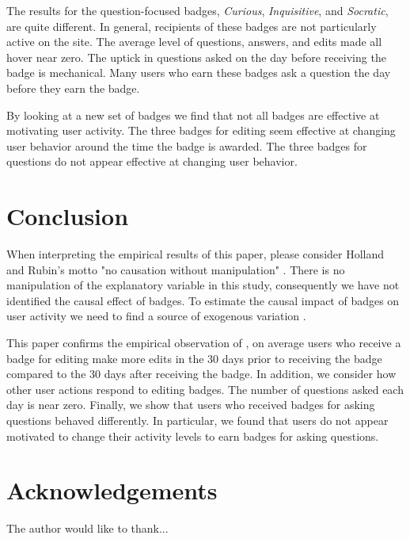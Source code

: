 \documentclass[conference]{IEEEtran}
\newcommand{\1}{\mathds{1}}
\begin{document}
The results for the question-focused badges, \textit{Curious}, \textit{Inquisitive}, and \textit{Socratic}, are quite different. In general, recipients of these badges are not particularly active on the site. The average level of questions, answers, and edits made all hover near zero. The uptick in questions asked on the day before receiving the badge is mechanical. Many users who earn these badges ask a question the day before they earn the badge.

By looking at a new set of badges we find that not all badges are effective at motivating user activity. The three badges for editing seem effective at changing user behavior around the time the badge is awarded. The three badges for questions do not appear effective at changing user behavior.

\section{Conclusion}

When interpreting the empirical results of this paper, please consider Holland and Rubin's motto "no causation without manipulation" \citep{Holland1986}. There is no manipulation of the explanatory variable in this study, consequently we have not identified the causal effect of badges. To estimate the causal impact of badges on user activity we need to find a source of exogenous variation \citep{Miller2013}.

This paper confirms the empirical observation of \citet{Grant2013}, on average users who receive a badge for editing make more edits in the 30 days prior to receiving the badge compared to the 30 days after receiving the badge. In addition, we consider how other user actions respond to editing badges. The number of questions asked each day is near zero. Finally, we show that users who received badges for asking questions behaved differently. In particular, we found that users do not appear motivated to change their activity levels to earn badges for asking questions.

\section*{Acknowledgements}

The author would like to thank...

\nocite{MSRChallenge2015, se-dump}

\renewcommand{\bibfont}{\small}


\end{document}
